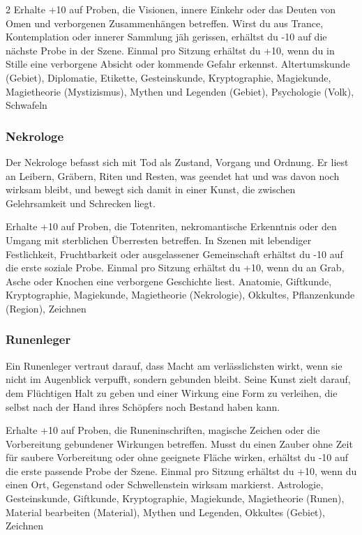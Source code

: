 {\begin{multicols*}{2}
        \wegespielwertebox
        {Erhalte +10 auf Proben, die Visionen, innere Einkehr oder das Deuten von Omen und verborgenen Zusammenhängen betreffen.}
        {Wirst du aus Trance, Kontemplation oder innerer Sammlung jäh gerissen, erhältst du -10 auf die nächste Probe in der Szene.}
        {Einmal pro Sitzung erhältst du +10, wenn du in Stille eine verborgene Absicht oder kommende Gefahr erkennst.}
        {Altertumskunde (Gebiet), Diplomatie, Etikette, Gesteinskunde, Kryptographie, Magiekunde, Magietheorie (Mystizismus), Mythen und Legenden (Gebiet), Psychologie (Volk), Schwafeln}

        \subsubsection*{Nekrologe}
        Der Nekrologe befasst sich mit Tod als Zustand, Vorgang und Ordnung. Er liest an Leibern, Gräbern, Riten und Resten, was geendet hat und was davon noch wirksam bleibt, und bewegt sich damit in einer Kunst, die zwischen Gelehrsamkeit und Schrecken liegt.

        \wegespielwertebox
        {Erhalte +10 auf Proben, die Totenriten, nekromantische Erkenntnis oder den Umgang mit sterblichen Überresten betreffen.}
        {In Szenen mit lebendiger Festlichkeit, Fruchtbarkeit oder ausgelassener Gemeinschaft erhältst du -10 auf die erste soziale Probe.}
        {Einmal pro Sitzung erhältst du +10, wenn du an Grab, Asche oder Knochen eine verborgene Geschichte liest.}
        {Anatomie, Giftkunde, Kryptographie, Magiekunde, Magietheorie (Nekrologie), Okkultes, Pflanzenkunde (Region), Zeichnen}

        \subsubsection*{Runenleger}
        Ein Runenleger vertraut darauf, dass Macht am verlässlichsten wirkt, wenn sie nicht im Augenblick verpufft, sondern gebunden bleibt. Seine Kunst zielt darauf, dem Flüchtigen Halt zu geben und einer Wirkung eine Form zu verleihen, die selbst nach der Hand ihres Schöpfers noch Bestand haben kann.

        \wegespielwertebox
        {Erhalte +10 auf Proben, die Runeninschriften, magische Zeichen oder die Vorbereitung gebundener Wirkungen betreffen.}
        {Musst du einen Zauber ohne Zeit für saubere Vorbereitung oder ohne geeignete Fläche wirken, erhältst du -10 auf die erste passende Probe der Szene.}
        {Einmal pro Sitzung erhältst du +10, wenn du einen Ort, Gegenstand oder Schwellenstein wirksam markierst.}
        {Astrologie, Gesteinskunde, Giftkunde, Kryptographie, Magiekunde, Magietheorie (Runen), Material bearbeiten (Material), Mythen und Legenden, Okkultes (Gebiet), Zeichnen}


\end{multicols*}}
